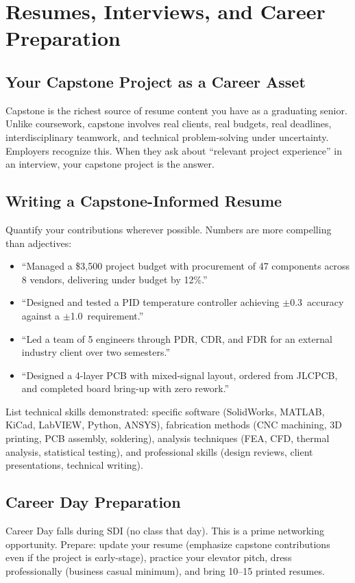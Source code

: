 \chapter{Resumes, Interviews, and Career Preparation}

\section{Your Capstone Project as a Career Asset}
Capstone is the richest source of resume content you have as a graduating senior. Unlike coursework, capstone involves real clients, real budgets, real deadlines, interdisciplinary teamwork, and technical problem-solving under uncertainty. Employers recognize this. When they ask about ``relevant project experience'' in an interview, your capstone project is the answer.

\section{Writing a Capstone-Informed Resume}
Quantify your contributions wherever possible. Numbers are more compelling than adjectives:

\begin{itemize}[nosep,leftmargin=1.5em]
\item ``Managed a \$3,500 project budget with procurement of 47 components across 8 vendors, delivering under budget by 12\%.''
\item ``Designed and tested a PID temperature controller achieving $\pm$0.3\,\degC{} accuracy against a $\pm$1.0\,\degC{} requirement.''
\item ``Led a team of 5 engineers through PDR, CDR, and FDR for an external industry client over two semesters.''
\item ``Designed a 4-layer PCB with mixed-signal layout, ordered from JLCPCB, and completed board bring-up with zero rework.''
\end{itemize}

List technical skills demonstrated: specific software (SolidWorks, MATLAB, KiCad, LabVIEW, Python, ANSYS), fabrication methods (CNC machining, 3D printing, PCB assembly, soldering), analysis techniques (FEA, CFD, thermal analysis, statistical testing), and professional skills (design reviews, client presentations, technical writing).

\section{Career Day Preparation}
Career Day falls during SDI (no class that day). This is a prime networking opportunity. Prepare: update your resume (emphasize capstone contributions even if the project is early-stage), practice your elevator pitch, dress professionally (business casual minimum), and bring 10--15 printed resumes.

